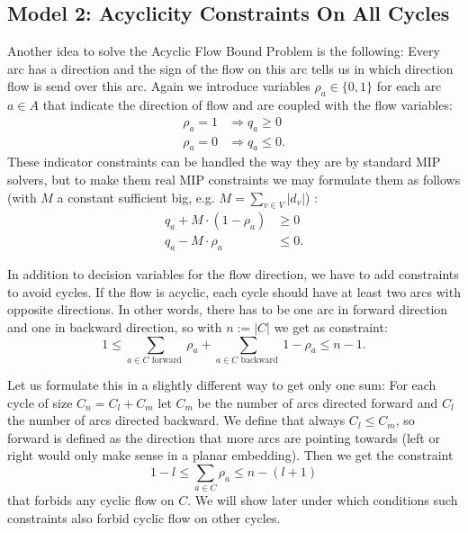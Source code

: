 \subsection{Model 2: Acyclicity Constraints On All Cycles}
\label{model:AcyclicityConstraints}
Another idea to solve the Acyclic Flow Bound Problem 
is the following: Every arc has a direction and the 
sign of the flow on this arc tells us in which direction flow is send over this arc. Again we introduce variables 
$\rho_a\in \{0,1\}$ for each arc $a\in A$ that indicate the direction of flow and are coupled with the flow variables:
\begin{align*}
\rho_a=1 & \Rightarrow q_a\ge 0 \\
\rho_a=0 & \Rightarrow q_a\le 0.
\end{align*}
These indicator constraints can be handled the way they are by standard MIP solvers, but to make them real MIP 
constraints we may formulate them as follows (with $M$ a constant sufficient big, e.g. $M=\sum_{v\in V}|d_v|$) :
\begin{align*}
 q_a + M\cdot (1-\rho_a) &\ge 0\\
 q_a - M\cdot \rho_a & \le 0.
\end{align*}

In addition to decision variables for the flow direction, we have to add constraints to avoid cycles. If the flow is 
acyclic, each cycle should have at least two arcs with opposite directions. In other words, there has to be one arc
in forward direction and one in backward direction, so with $n:=|C|$ we get as constraint:
$$ 1\le\sum_{a\in C\textrm{ forward }} \rho_a + \sum_{a\in C\textrm{ backward }}1-\rho_a\le n-1.$$

Let us formulate this in a slightly different way to get only one sum: For each cycle of size $C_n=C_l+C_m$ 
let $C_m$ be the number of arcs directed forward and $C_l$ the number of arcs directed backward. We define that always 
$C_l\le C_m$, so forward is defined as the direction that more arcs are pointing towards (left or right would only 
make sense in a planar embedding). Then we get the constraint $$1-l \le \sum_{a\in C}\rho_a\le n-(l+1)$$ that forbids 
any cyclic flow on $C$. We will show later under which conditions such constraints also forbid cyclic flow on other 
cycles. 

